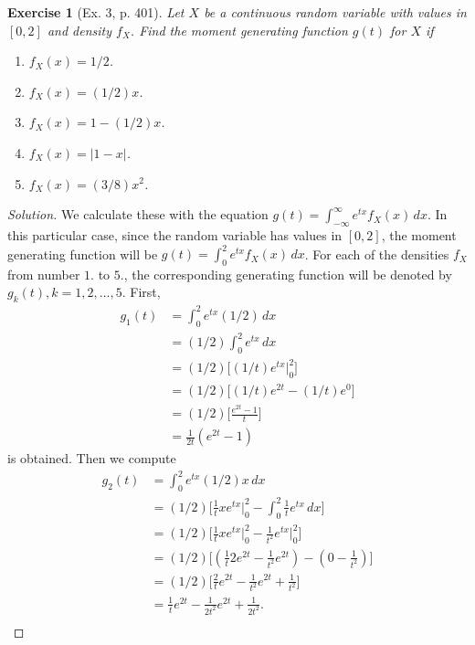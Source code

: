 \documentclass[letterpaper, 10 pt, conference]{article}
\newtheorem{ex}{Exercise}
\begin{document}
\begin{ex}[Ex. 3, p. 401]
	Let $X$ be a continuous random variable with values in $[0,2]$ and density $f_X$. Find the moment generating function $g(t)$ for $X$ if 
	\begin{enumerate}
	\item $f_X (x) = 1/2$.
	\item $f_X (x) = (1/2) x$.
	\item $ f_X(x) = 1 - (1/2) x $.
	\item $ f_X (x) = |1-x| $.
	\item $ f_X (x) = (3/8) x^2 $.
	\end{enumerate}
\end{ex}
\begin{proof}[Solution]
	We calculate these with the equation $g(t) = \int_{-\infty}^{\infty} e^{tx} f_X (x) \, dx$. In this particular case, since the random variable has values in $[0,2]$, the moment generating function will be $g(t) = \int_{0}^{2} e^{tx} f_X (x) \, dx$. For each of the densities $f_X$ from number $1.$ to $5.$, the corresponding generating function will be denoted by $g_k (t), k = 1, 2, \dots, 5$. First,
	\begin{align}
		g_1 (t) &= \int_{0}^{2} e^{tx} (1/2) \, dx \\
		&= (1/2) \int_{0}^{2} e^{tx} \, dx \\
		&= (1/2) \lbrack (1/t) e^{tx} \Big\lvert^{2}_{0} \rbrack \\
		&= (1/2) \lbrack (1/t) e^{2t} - (1/t) e^0 \rbrack \\
		&= (1/2) \lbrack \frac{e^{2t} - 1}{t} \rbrack \\
		&= \frac{1}{2t} (e^{2t} - 1)
	\end{align}
	is obtained. Then we compute
	\begin{align}
		g_2 (t) &= \int_{0}^{2} e^{tx} (1/2) x \, dx \\
		&= (1/2) \lbrack \frac{1}{t} x e^{tx} \Big\lvert^{2}_{0} - \int_{0}^{2} \frac{1}{t} e^{tx} \, dx \rbrack \\
		&= (1/2) \lbrack \frac{1}{t} x e^{tx} \Big\lvert^{2}_{0} - \frac{1}{t^2} e^{tx} \Big\lvert^{2}_{0} \rbrack \\
		&= (1/2) \lbrack ( \frac{1}{t} 2 e^{2t} - \frac{1}{t^2} e^{2t} ) - ( 0 - \frac{1}{t^2} ) \rbrack \\
		&= (1/2) \lbrack \frac{2}{t} e^{2t} - \frac{1}{t^2} e^{2t} + \frac{1}{t^2} \rbrack \\
		&= \frac{1}{t} e^{2t} - \frac{1}{2t^2} e^{2t} + \frac{1}{2t^2} .\\ 

\end{align}
\end{proof}
\end{document}
